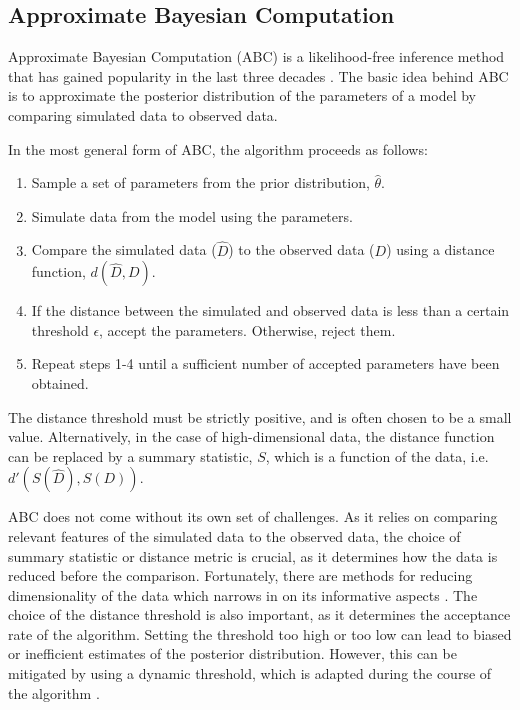 \subsection{Approximate Bayesian Computation}
Approximate Bayesian Computation (ABC) is a likelihood-free inference method that has gained popularity in the
last three decades \cite{tavare_inferring_1997, lechevallier_integrating_2010, jagiella_parallelization_2017}.
The basic idea behind ABC is to approximate the posterior distribution of the parameters of a model by comparing
simulated data to observed data. \par
In the most general form of ABC, the algorithm proceeds as follows:
\begin{enumerate}
    \item Sample a set of parameters from the prior distribution, $\hat\theta$.
    \item Simulate data from the model using the parameters.
    \item Compare the simulated data ($\hat D$) to the observed data ($D$) using a distance function, $d(\hat D, D)$.
    \item If the distance between the simulated and observed data is less than a certain threshold $\epsilon$, accept the
    parameters. Otherwise, reject them.
    \item Repeat steps 1-4 until a sufficient number of accepted parameters have been obtained.
\end{enumerate}
The distance threshold must be strictly positive, and is often chosen to be a small value. Alternatively, in the
case of high-dimensional data, the distance function can be replaced by a summary statistic, $S$, which is a function of the
data, i.e. $d'(S(\hat D), S(D))$. \par
ABC does not come without its own set of challenges. As it relies on comparing relevant features of the simulated data to
the observed data, the choice of summary statistic or distance metric is crucial, as it determines how the data is
reduced before the comparison. Fortunately, there are methods for reducing dimensionality of the data which
narrows in on its informative aspects \cite{blum_comparative_2013}.
The choice of the distance threshold is also important, as it determines
the acceptance rate of the algorithm. Setting the threshold too high or too low can lead to biased or inefficient
estimates of the posterior distribution. However, this can be mitigated by using a dynamic threshold, which is
adapted during the course of the algorithm \cite{prangle_adapting_2017}.
